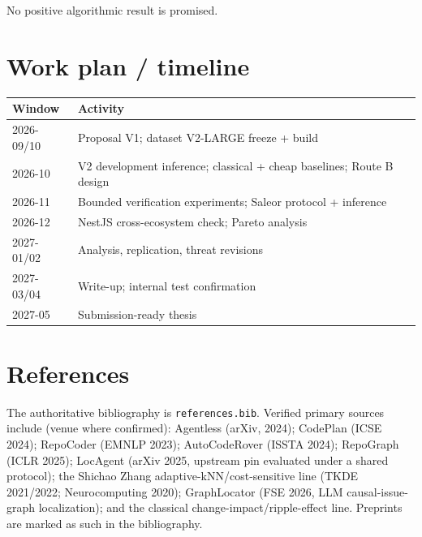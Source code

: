 \documentclass[11pt,a4paper]{article}
\begin{document}
No positive algorithmic result is promised.

\section{Work plan / timeline}
\label{sec:timetable}

\begin{tabular}{ll}
\toprule
\textbf{Window} & \textbf{Activity} \\
\midrule
2026-09/10 & Proposal V1; dataset V2-LARGE freeze + build \\
2026-10 & V2 development inference; classical + cheap baselines; Route B design \\
2026-11 & Bounded verification experiments; Saleor protocol + inference \\
2026-12 & NestJS cross-ecosystem check; Pareto analysis \\
2027-01/02 & Analysis, replication, threat revisions \\
2027-03/04 & Write-up; internal test confirmation \\
2027-05 & Submission-ready thesis \\
\bottomrule
\end{tabular}

\section{References}
\label{sec:refs}

The authoritative bibliography is \texttt{references.bib}. Verified primary
sources include (venue where confirmed): Agentless (arXiv, 2024); CodePlan
(ICSE 2024); RepoCoder (EMNLP 2023); AutoCodeRover (ISSTA 2024); RepoGraph
(ICLR 2025); LocAgent (arXiv 2025, upstream pin evaluated under a shared
protocol); the Shichao Zhang adaptive-kNN/cost-sensitive line (TKDE 2021/2022;
Neurocomputing 2020); GraphLocator (FSE 2026, LLM causal-issue-graph
localization); and the classical change-impact/ripple-effect line. Preprints
are marked as such in the bibliography.
\end{document}
